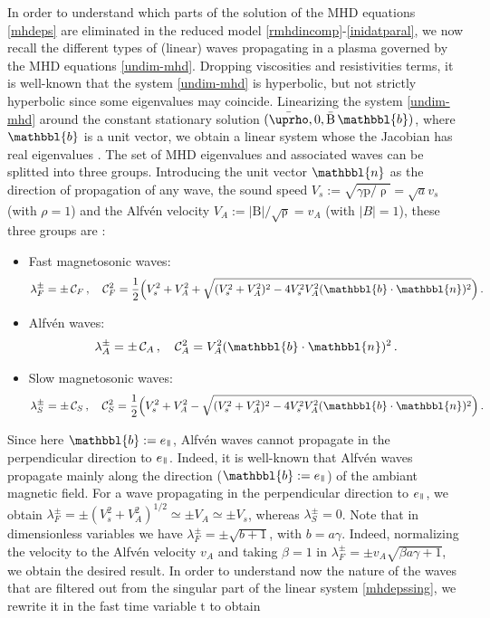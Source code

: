 \documentclass[11pt,reqno]{amsart}
\newcommand{\myparallel}{{\mkern3mu\vphantom{\perp}\vrule depth 0pt\mkern2mu\vrule depth 0pt\mkern3mu}}
\begin{document}
In order to understand which parts of the solution of the MHD equations \eqref{mhdeps} are eliminated in the reduced model \eqref{rmhdincomp}-\eqref{inidatparal}, we now recall the different types of (linear) waves propagating in a plasma governed by the MHD equations \eqref{undim-mhd}. Dropping viscosities and resistivities terms, it is well-known \cite{RB96} that the system \eqref{undim-mhd} is hyperbolic, but not strictly hyperbolic since some eigenvalues may coincide. Linearizing the system \eqref{undim-mhd} around the constant stationary solution $(\bar \uprho,0, \bar{\text{B}}\,\mathbbl{b})$, where $\mathbbl{b}$ is a unit vector, we obtain a linear system whose the Jacobian has real eigenvalues \cite{GP04}. The set of MHD eigenvalues and associated waves can be splitted into three groups. Introducing the unit vector $\mathbbl{n}$ as the direction of propagation of any wave, the sound speed  $V_s:=\sqrt{\gamma \text{p}/\uprho}=\sqrt{a}v_s$ (with $\rho=1$) and the Alfv\'en  velocity $V_A:=|\text{B}|/\sqrt{\uprho}=v_A$ (with $|B|=1$), these three groups are  \cite{GP04}:    
\begin{itemize}
\item Fast magnetosonic waves:
  \[
  \lambda_F^\pm= \pm\, \mathcal C_F\,, \quad \mathcal C_F^2=\frac12 \Big(V_s^2+V_A^2 + \sqrt{(V_s^2+V_A^2)^2 -4V_s^2V_A^2(\mathbbl{b}\cdot\mathbbl{n})^2} \Big)\,.
  \]
\item Alfv\'en waves:
  \[
  \lambda_A^\pm= \pm  \,\mathcal C_A\,, \quad  \mathcal C_A^2=V_A^2(\mathbbl{b}\cdot\mathbbl{n})^2\,.
  \]
\item Slow magnetosonic waves:
  \[
  \lambda_S^\pm= \pm \, \mathcal C_S\,, \quad  \mathcal C_S^2=\frac12 \Big(V_s^2+V_A^2 - \sqrt{(V_s^2+V_A^2)^2 -4V_s^2V_A^2(\mathbbl{b}\cdot\mathbbl{n})^2} \Big)\,.
  \]  
\end{itemize}
Since here $\mathbbl{b}:=e_\myparallel$, Alfv\'en waves cannot propagate in the perpendicular direction to $e_\myparallel$. Indeed, it is well-known \cite{GP04} that Alfv\'en waves propagate mainly along the direction ($\mathbbl{b}:=e_\myparallel$) of the ambiant magnetic field. For a wave propagating in the perpendicular direction to $e_\myparallel$, we obtain  $\lambda_F^\pm=\pm (V_s^2+V_A^2)^{1/2}\simeq \pm V_A \simeq \pm V_s$, whereas   $\lambda_S^\pm=0$. Note that in dimensionless variables we have $\lambda_F^\pm=\pm\sqrt{b+1}$, with $b=a\gamma$. Indeed, normalizing the velocity to the Alfv\'en velocity $v_A$ and taking $\beta=1$  in $\lambda_F^\pm=\pm v_A\sqrt{\beta a \gamma+1}$, we obtain the desired result. In order to understand now the nature of the waves that are filtered out from the singular part of the linear system \eqref{mhdepssing}, we rewrite it in the fast time variable $\text{t}$ to obtain
\end{document}
